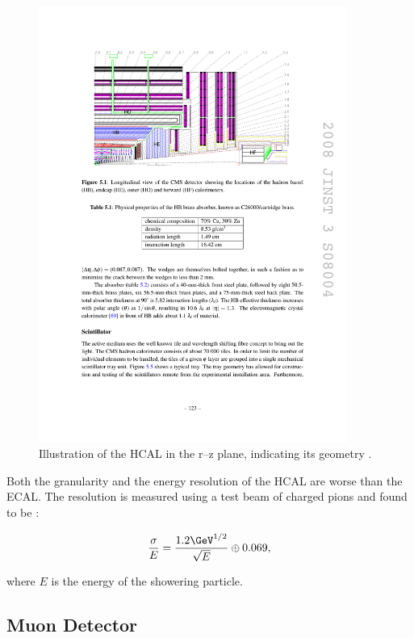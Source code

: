 \begin{figure}[htbp]
   \includegraphics[width=0.9\textwidth]{plots/detector/hcal_layout.pdf}
\caption[Illustration of the HCAL in the r--z plane, indicating its
geometry.]
{Illustration of the \ac{HCAL} in the r--z plane, indicating its geometry \cite{Chatrchyan:2008aa}.}
\label{fig:hcal}
\end{figure}

Both the granularity and the energy resolution of the \ac{HCAL} are worse than
the \ac{ECAL}. The resolution is measured using a test beam of charged pions and
found to be \cite{Chatrchyan:2008aa}:

\begin{equation}
\frac{\sigma}{E} = \frac{1.2\GeV^{1/2}}{\sqrt{E}} \oplus 0.069,
\end{equation}

where $E$ is the energy of the showering particle. 

\subsection{Muon Detector}
\label{sec:muondetector}

